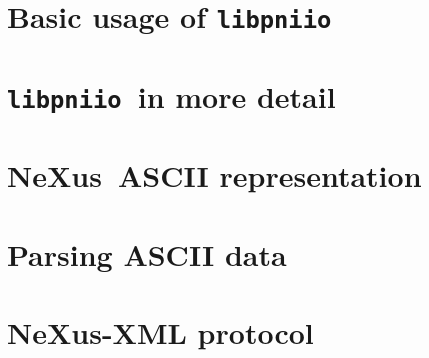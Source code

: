 \documentclass[a4paper,draft]{scrbook}
\newcommand{\libpniio}{\texttt{libpniio}}
\newcommand{\nexus}{NeXus}
\begin{document}
\chapter{Basic usage of \libpniio}\label{chapter:basicusage}

\FloatBarrier


\chapter{\libpniio\ in more detail}\label{chapter:advancedusage}

\FloatBarrier

\chapter{\nexus\ ASCII representation}

\FloatBarrier

\appendix
\chapter{Parsing ASCII data}\label{appendix:parsers}

\FloatBarrier

\chapter{\nexus-XML protocol}\label{appendix:xml_protocol}




\end{document}
